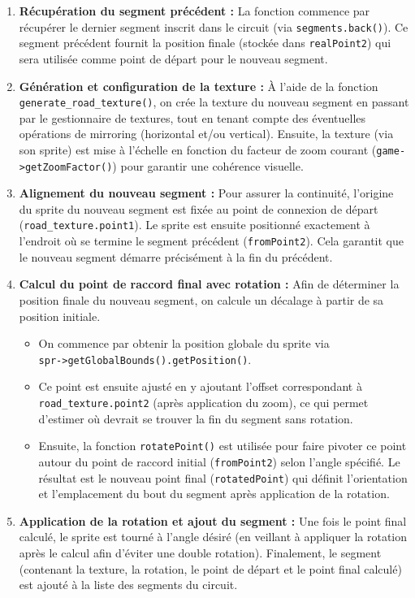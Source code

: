 \begin{enumerate}
    \item \textbf{Récupération du segment précédent :}
    La fonction commence par récupérer le dernier segment inscrit dans le circuit (via \texttt{segments.back()}).
    Ce segment précédent fournit la position finale (stockée dans \texttt{realPoint2}) qui sera utilisée comme point de départ pour le nouveau segment.

    \item \textbf{Génération et configuration de la texture :}
    À l'aide de la fonction \\\texttt{generate\_road\_texture()}, on crée la texture du nouveau segment en passant par le gestionnaire de textures, tout en tenant compte des éventuelles opérations de mirroring (horizontal et/ou vertical).
    Ensuite, la texture (via son \gls{sprite}) est mise à l’échelle en fonction du facteur de zoom courant (\texttt{game->getZoomFactor()}) pour garantir une cohérence visuelle.

    \item \textbf{Alignement du nouveau segment :}
    Pour assurer la continuité, l'origine du \gls{sprite} du nouveau segment est fixée au point de connexion de départ (\texttt{road\_texture.point1}).
    Le \gls{sprite} est ensuite positionné exactement à l'endroit où se termine le segment précédent (\texttt{fromPoint2}).
    Cela garantit que le nouveau segment démarre précisément à la fin du précédent.

    \item \textbf{Calcul du point de raccord final avec rotation :}
    Afin de déterminer la position finale du nouveau segment, on calcule un décalage à partir de sa position initiale.
    \begin{itemize}
        \item On commence par obtenir la position globale du \gls{sprite} via \\\texttt{spr->getGlobalBounds().getPosition()}.
        \item Ce point est ensuite ajusté en y ajoutant l'offset correspondant à \\\texttt{road\_texture.point2} (après application du zoom), ce qui permet d'estimer où devrait se trouver la fin du segment sans rotation.
        \item Ensuite, la fonction \texttt{rotatePoint()} est utilisée pour faire pivoter ce point autour du point de raccord initial (\texttt{fromPoint2}) selon l'angle spécifié.
        Le résultat est le nouveau point final (\texttt{rotatedPoint}) qui définit l'orientation et l'emplacement du bout du segment après application de la rotation.
    \end{itemize}

    \item \textbf{Application de la rotation et ajout du segment :}
    Une fois le point final calculé, le \gls{sprite} est tourné à l’angle désiré (en veillant à appliquer la rotation après le calcul afin d’éviter une double rotation).
    Finalement, le segment (contenant la texture, la rotation, le point de départ et le point final calculé) est ajouté à la liste des segments du circuit.
\end{enumerate}

